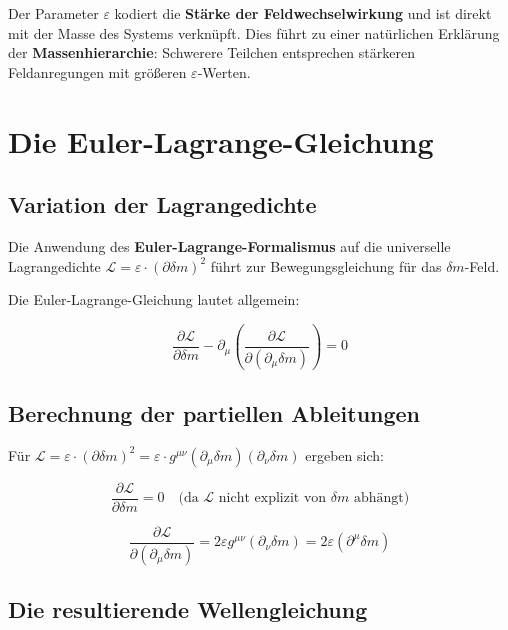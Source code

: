 \documentclass[12pt,a4paper]{report}
\begin{document}
	Der Parameter $\varepsilon$ kodiert die \textbf{Stärke der Feldwechselwirkung} und ist direkt mit der Masse des Systems verknüpft. Dies führt zu einer natürlichen Erklärung der \textbf{Massenhierarchie}: Schwerere Teilchen entsprechen stärkeren Feldanregungen mit größeren $\varepsilon$-Werten.
	
	\section{Die Euler-Lagrange-Gleichung}
	
	\subsection{Variation der Lagrangedichte}
	
	Die Anwendung des \textbf{Euler-Lagrange-Formalismus} auf die universelle Lagrangedichte $\mathcal{L} = \varepsilon \cdot (\partial\delta m)^2$ führt zur Bewegungsgleichung für das $\delta m$-Feld.
	
	Die Euler-Lagrange-Gleichung lautet allgemein:
	
	\begin{equation}
		\frac{\partial\mathcal{L}}{\partial\delta m} - \partial_\mu\left(\frac{\partial\mathcal{L}}{\partial(\partial_\mu\delta m)}\right) = 0
	\end{equation}
	
	\subsection{Berechnung der partiellen Ableitungen}
	
	Für $\mathcal{L} = \varepsilon \cdot (\partial\delta m)^2 = \varepsilon \cdot g^{\mu\nu} (\partial_\mu\delta m)(\partial_\nu\delta m)$ ergeben sich:
	
	\begin{equation}
		\frac{\partial\mathcal{L}}{\partial\delta m} = 0 \quad \text{(da $\mathcal{L}$ nicht explizit von $\delta m$ abhängt)}
	\end{equation}
	
	\begin{equation}
		\frac{\partial\mathcal{L}}{\partial(\partial_\mu\delta m)} = 2\varepsilon g^{\mu\nu} (\partial_\nu\delta m) = 2\varepsilon (\partial^\mu\delta m)
	\end{equation}
	
	\subsection{Die resultierende Wellengleichung}
	
\end{document}
